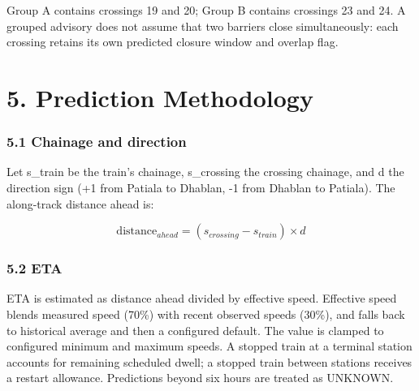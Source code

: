 \documentclass[12pt,a4paper]{report}
\begin{document}
Group A contains crossings 19 and 20; Group B contains crossings 23 and 24. A grouped advisory does not assume that two barriers close simultaneously: each crossing retains its own predicted closure window and overlap flag.

\chapter{5. Prediction Methodology}
\subsection{5.1 Chainage and direction}
Let s\_train be the train's chainage, s\_crossing the crossing chainage, and d the direction sign (+1 from Patiala to Dhablan, -1 from Dhablan to Patiala). The along-track distance ahead is:

\[\mathrm{distance}_{ahead}=(s_{crossing}-s_{train})\times d\]
\subsection{5.2 ETA}
ETA is estimated as distance ahead divided by effective speed. Effective speed blends measured speed (70\%) with recent observed speeds (30\%), and falls back to historical average and then a configured default. The value is clamped to configured minimum and maximum speeds. A stopped train at a terminal station accounts for remaining scheduled dwell; a stopped train between stations receives a restart allowance. Predictions beyond six hours are treated as UNKNOWN.
\end{document}
